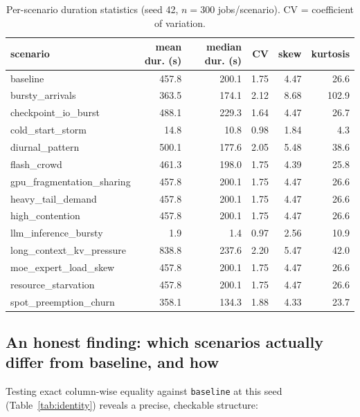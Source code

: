 \documentclass[11pt]{article}
\begin{document}
\begin{table}[h]
\centering
\caption{Per-scenario duration statistics (seed 42, $n=300$ jobs/scenario). CV = coefficient of variation.}
\label{tab:scenario-stats}
\small
\begin{tabular}{lrrrrr}
\toprule
scenario & mean dur. (s) & median dur. (s) & CV & skew & kurtosis \\
\midrule
baseline                  & 457.8 & 200.1 & 1.75 & 4.47 & 26.6 \\
bursty\_arrivals          & 363.5 & 174.1 & 2.12 & 8.68 & 102.9 \\
checkpoint\_io\_burst     & 488.1 & 229.3 & 1.64 & 4.47 & 26.7 \\
cold\_start\_storm        & 14.8  & 10.8  & 0.98 & 1.84 & 4.3 \\
diurnal\_pattern          & 500.1 & 177.6 & 2.05 & 5.48 & 38.6 \\
flash\_crowd              & 461.3 & 198.0 & 1.75 & 4.39 & 25.8 \\
gpu\_fragmentation\_sharing & 457.8 & 200.1 & 1.75 & 4.47 & 26.6 \\
heavy\_tail\_demand       & 457.8 & 200.1 & 1.75 & 4.47 & 26.6 \\
high\_contention          & 457.8 & 200.1 & 1.75 & 4.47 & 26.6 \\
llm\_inference\_bursty    & 1.9   & 1.4   & 0.97 & 2.56 & 10.9 \\
long\_context\_kv\_pressure & 838.8 & 237.6 & 2.20 & 5.47 & 42.0 \\
moe\_expert\_load\_skew   & 457.8 & 200.1 & 1.75 & 4.47 & 26.6 \\
resource\_starvation      & 457.8 & 200.1 & 1.75 & 4.47 & 26.6 \\
spot\_preemption\_churn   & 358.1 & 134.3 & 1.88 & 4.33 & 23.7 \\
\bottomrule
\end{tabular}
\end{table}

\subsection{An honest finding: which scenarios actually differ from baseline, and how}
Testing exact column-wise equality against \texttt{baseline} at this seed
(Table~\ref{tab:identity}) reveals a precise, checkable structure:
\end{document}
